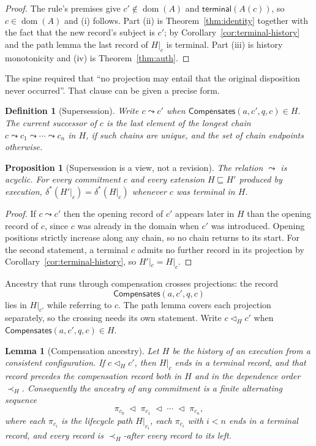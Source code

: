 \documentclass[11pt,openany]{book}
\newtheorem{lemma}[theorem]{Lemma}
\newtheorem{proposition}[theorem]{Proposition}
\newtheorem{definition}[theorem]{Definition}
\theoremstyle{remark}
\newcommand{\Compensates}{\mathsf{Compensates}}
\newcommand{\dom}{\operatorname{dom}}
\begin{document}
\begin{proof}
The rule's premises give $c'\notin\dom(A)$ and $\mathsf{terminal}(A(c))$,
so $c\in\dom(A)$ and (i) follows. Part (ii) is Theorem~\ref{thm:identity}
together with the fact that the new record's subject is $c'$; by
Corollary~\ref{cor:terminal-history} and the path lemma the last record of
$H|_c$ is terminal. Part (iii) is history monotonicity and (iv) is
Theorem~\ref{thm:auth}.
\end{proof}

The spine required that ``no projection may entail that the original
disposition never occurred''. That clause can be given a precise form.

\begin{definition}[Supersession]
Write $c\leadsto c'$ when $\Compensates(a,c',q,c)\in H$. The
\emph{current successor} of $c$ is the last element of the longest chain
$c\leadsto c_1\leadsto\cdots\leadsto c_n$ in $H$, if such chains are
unique, and the set of chain endpoints otherwise.
\end{definition}

\begin{proposition}[Supersession is a view, not a revision]
\label{prop:supersession}
The relation $\leadsto$ is acyclic. For every commitment $c$ and every
extension $H\sqsubseteq H'$ produced by execution,
$\delta^{*}(H'|_c)=\delta^{*}(H|_c)$ whenever $c$ was terminal in $H$.
\end{proposition}

\begin{proof}
If $c\leadsto c'$ then the opening record of $c'$ appears later in $H$ than
the opening record of $c$, since $c$ was already in the domain when $c'$
was introduced. Opening positions strictly increase along any chain, so no
chain returns to its start. For the second statement, a terminal $c$
admits no further record in its projection by
Corollary~\ref{cor:terminal-history}, so $H'|_c=H|_c$.
\end{proof}

Ancestry that runs through compensation crosses projections: the record
\[
\Compensates(a,c',q,c)
\]
lies in $H|_{c'}$ while referring to $c$. The
path lemma covers each projection separately, so the crossing needs its
own statement. Write $c\triangleleft_H c'$ when
$\Compensates(a,c',q,c)\in H$.

\begin{lemma}[Compensation ancestry]\label{lem:companc}
Let $H$ be the history of an execution from a consistent configuration.
If $c\triangleleft_H c'$, then $H|_c$ ends in a terminal record, and that
record precedes the compensation record both in $H$ and in the dependence
order $\prec_H$. Consequently the ancestry of any commitment is a finite
alternating sequence
\[
\pi_{c_0}\;\triangleleft\;\pi_{c_1}\;\triangleleft\;\cdots\;\triangleleft\;\pi_{c_n},
\]
where each $\pi_{c_i}$ is the lifecycle path $H|_{c_i}$, each $\pi_{c_i}$
with $i<n$ ends in a terminal record, and every record is
$\prec_H$-after every record to its left.
\end{lemma}
\end{document}

